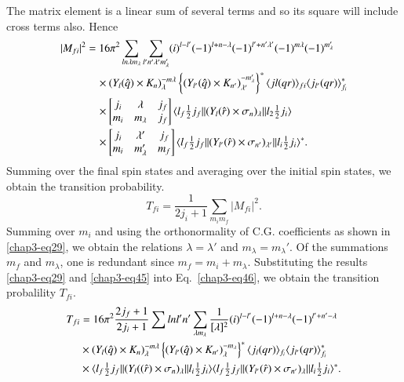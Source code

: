 The matrix element is a linear sum of several terms and so its square will include cross terms also. Hence
\begin{align}
  |M_{fi}|^2 & = 16\pi^2 \sum_{ln\lambda m_\lambda} \sum_{l' n' \lambda' m_\lambda '} (i)^{l-l'} (-1)^{l + n - \lambda} (-1)^{l' + n' \lambda'} (-1)^{m\lambda} (-1)^{m_\lambda'} \notag \\
  &  \quad \times (Y_l ({\boldmath \hat{q}}) \times {\boldmath K}_n)_\lambda^{-m\lambda}  \left\{ (Y_{l'} ({\boldmath \hat{q}}) \times {\boldmath K}_{n'})_{\lambda'}^{-m_\lambda'}\right\}^\ast \langle jl (qr)\rangle_{fi} \langle j_{l'}(qr)\rangle^\ast_{f_i} \notag \\
  & \quad \times \begin{bmatrix} j_i & \lambda & j_f\\ m_i & m_\lambda & j_f \end{bmatrix}
  \langle l_f \tfrac{1}{2} j_f || (Y_l ({\boldmath \hat{r}}) \times \sigma_n)_\lambda || l_2 \tfrac{1}{2} j_i \rangle \notag \\
  & \quad \times \begin{bmatrix} j_i & \lambda' & j_f\\ m_i & m_\lambda' & m_f \end{bmatrix}
  \langle l_f \tfrac{1}{2} j_f || (Y_{l'} ({\boldmath \hat{r}}) \times \sigma_{n'})_{\lambda'} || l_i \tfrac{1}{2} j_i \rangle^\ast. \label{chap3-eq45}
\end{align}
Summing over the final spin states and averaging over the initial spin states, we obtain the transition probability.
\begin{equation}
  T_{fi} = \frac{1}{2j_i +1} \sum_{m_i m_f} |M_{fi}|^2. \label{chap3-eq46}
\end{equation}
Summing over $m_i$ and using the orthonormality of C.G. coefficients as shown in \eqref{chap3-eq29}, we obtain the relations $\lambda = \lambda'$ and $m_\lambda= m_\lambda'$. Of the summations $m_f$ and $m_\lambda$, one is redundant since $m_f= m_i+ m_\lambda$. Substituting the results \eqref{chap3-eq29} and \eqref{chap3-eq45} into Eq.\ \eqref{chap3-eq46}, we obtain the transition probalility $T_{fi}$.
\begin{align}
  T_{fi} & = 16\pi^2 \frac{2j_f +1}{2j_i+1} \sum{lnl'n'} \sum_{\lambda m_\lambda} \frac{1}{[\lambda]^2} (i)^{l-l'} (-1)^{l+ n - \lambda} (-1)^{l' + n'-\lambda}\notag \\
  &  \times (Y_l ({\boldmath \hat{q}}) \times {\boldmath K}_n)^{-m\lambda}_\lambda \left\{ (Y_{l'}({\boldmath \hat{q}}) \times {\boldmath K}_{n'})_\lambda^{-m_\lambda}\right\}^\ast \langle j_l (qr)\rangle_{f_i} \langle j_{l'}(qr)\rangle_{f_i}^\ast \notag \\
  &  \times \langle l_f \tfrac{1}{2} j_f || (Y_l (({\boldmath \hat{r}}) \times \sigma_n)_\lambda || l_i \tfrac{1}{2}j_i \rangle \langle l_f \tfrac{1}{2} j_f  || (Y_{l'} ({\boldmath \hat{r}}) \times \sigma_{n'})_\lambda || l_i \tfrac{1}{2} j_i \rangle^\ast. \label{chap3-eq47}
\end{align}

